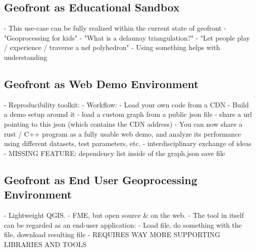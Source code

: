 












\subsection{Geofront as Educational Sandbox}
- This use-case can be fully realized within the current state of geofront
- "Geoprocessing for kids"
- "What is a delaunay triangulation?" 
- "Let people play / experience / traverse a nef polyhedron"
- Using something helps with understanding

\subsection{Geofront as Web Demo Environment}
- Reproducibility toolkit:
- Workflow: 
  - Load your own code from a CDN
  - Build a demo setup around it
  - load a custom graph from a public json file
  - share a url pointing to this json (which contains the CDN address)
- You can now share a rust / C++ program as a fully usable web demo,   
  and analyze its performance using different datasets, test parameters, etc. 
- interdisciplinary exchange of ideas
- MISSING FEATURE: dependency list inside of the graph.json save file

\subsection{Geofront as End User Geoprocessing Environment}
- Lightweight QGIS.
- FME, but open source \& on the web.
- The tool in itself can be regarded as an end-user application:
  - Load file, do something with the file, download resulting file
  - REQUIRES WAY MORE SUPPORTING LIBRARIES AND TOOLS

